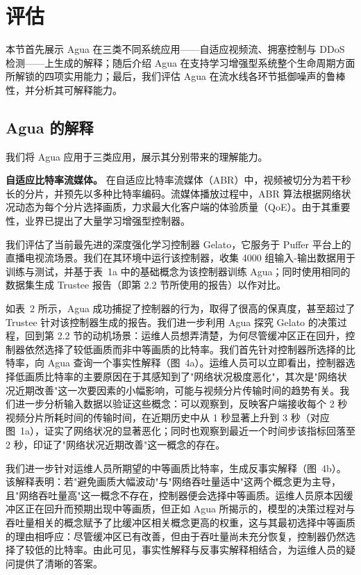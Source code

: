 \documentclass[11pt,a4paper]{article}
\begin{document}
\section{评估}

本节首先展示 Agua 在三类不同系统应用——自适应视频流、拥塞控制与 DDoS 检测——上生成的解释；随后介绍 Agua 在支持学习增强型系统整个生命周期方面所解锁的四项实用能力；最后，我们评估 Agua 在流水线各环节抵御噪声的鲁棒性，并分析其可解释能力。

\subsection{Agua 的解释}

我们将 Agua 应用于三类应用，展示其分别带来的理解能力。

\textbf{自适应比特率流媒体。} 在自适应比特率流媒体（ABR）中，视频被切分为若干秒长的分片，并预先以多种比特率编码。流媒体播放过程中，ABR 算法根据网络状况动态为每个分片选择画质，力求最大化客户端的体验质量（QoE）。由于其重要性，业界已提出了大量学习增强型控制器。

我们评估了当前最先进的深度强化学习控制器 Gelato，它服务于 Puffer 平台上的直播电视流场景。我们在其环境中运行该控制器，收集 4000 组输入-输出数据用于训练与测试，并基于表~1a 中的基础概念为该控制器训练 Agua；同时使用相同的数据集生成 Trustee 报告（即第 2.2 节所使用的报告）以作对比。

如表~2 所示，Agua 成功捕捉了控制器的行为，取得了很高的保真度，甚至超过了 Trustee 针对该控制器生成的报告。我们进一步利用 Agua 探究 Gelato 的决策过程，回到第 2.2 节的动机场景：运维人员想弄清楚，为何尽管缓冲区正在回升，控制器依然选择了较低画质而非中等画质的比特率。我们首先针对控制器所选择的比特率，向 Agua 查询一个事实性解释（图~4a）。运维人员可以立即看出，控制器选择低画质比特率的主要原因在于其感知到了"网络状况极度恶化"，其次是"网络状况近期改善"这一次要因素的小幅影响，可能与视频分片传输时间的趋势有关。我们进一步分析输入数据以验证这些概念：可以观察到，反映客户端接收每个 2 秒视频分片所耗时间的传输时间，在近期历史中从 1 秒显著上升到 3 秒（对应图~1a），证实了网络状况的显著恶化；同时也观察到最近一个时间步该指标回落至 2 秒，印证了"网络状况近期改善"这一概念的存在。

我们进一步针对运维人员所期望的中等画质比特率，生成反事实解释（图~4b）。该解释表明：若"避免画质大幅波动"与"网络吞吐量适中"这两个概念更为主导，且"网络吞吐量高"这一概念不存在，控制器便会选择中等画质。运维人员原本因缓冲区正在回升而预期出现中等画质，但正如 Agua 所揭示的，模型的决策过程对与吞吐量相关的概念赋予了比缓冲区相关概念更高的权重，这与其最初选择中等画质的理由相呼应：尽管缓冲区已有改善，但由于吞吐量尚未充分恢复，控制器仍然选择了较低的比特率。由此可见，事实性解释与反事实解释相结合，为运维人员的疑问提供了清晰的答案。
\end{document}
